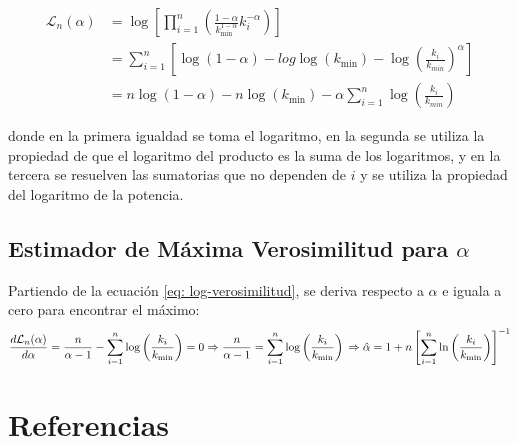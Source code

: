 \documentclass{article}
\begin{document}
\begin{align}
    \mathcal{L}_n(\alpha) & = \log \left[\prod_{i=1}^{n} \left( \frac{1-\alpha}{k_{\text{min}}^{1-\alpha}} k_i^{-\alpha} \right) \right] \nonumber               \\
                          & = \sum_{i=1}^{n} \left[ \log(1-\alpha) - log\log(k_{\text{min}}) - \log \left(\frac{k_i}{k_{min}} \right)^{\alpha} \right] \nonumber \\
                          & = n \log(1-\alpha) - n\log(k_{\text{min}}) - \alpha \sum_{i=1}^{n} \log\left(\frac{k_i}{k_{min}} \right)
\end{align}

donde en la primera igualdad se toma el logaritmo, en la segunda se utiliza la propiedad de que el logaritmo del producto es la suma de los logaritmos, y en la tercera se resuelven las sumatorias que no dependen de $i$ y se utiliza la propiedad del logaritmo de la potencia.

\subsection{Estimador de Máxima Verosimilitud para $\alpha$}

Partiendo de la ecuación \ref{eq: log-verosimilitud}, se deriva respecto a $\alpha$ e iguala a cero para encontrar el máximo:
$$
    \frac{d\mathcal{L}_n(\alpha)}{d\alpha} = \frac{n}{\alpha -1} - \sum_{i=1}^n \log \left(\frac{k_i}{k_\text{min}}\right) = 0 \\
    \Rightarrow \frac{n}{\alpha -1} = \sum_{i=1}^n \log \left(\frac{k_i}{k_\text{min}}\right) \\
    \Rightarrow \hat{\alpha} = 1 + n \left[ \sum_{i=1}^{n} \ln\left(\frac{k_i}{k_\text{min}}\right) \right]^{-1}
$$

\section{Referencias}


\end{document}
